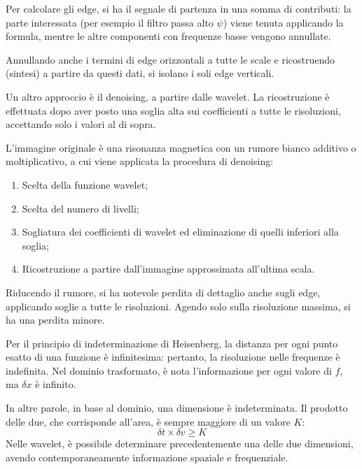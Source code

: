 Per calcolare gli edge, si ha il segnale di partenza in una somma di contributi: la parte interessata (per esempio il filtro passa alto $\psi$) viene tenuta applicando la formula, mentre le altre componenti con frequenze basse vengono annullate. 

Annullando anche i termini di edge orizzontali a tutte le scale e ricostruendo (sintesi) a partire da questi dati, si isolano i soli edge verticali.

Un altro approccio è il denoising, a partire dalle wavelet. La ricostruzione è effettuata dopo aver posto una soglia alta sui coefficienti a tutte le risoluzioni, accettando solo i valori al di sopra. 

L'immagine originale è una risonanza magnetica con un rumore bianco additivo o moltiplicativo, a cui viene applicata la procedura di denoising:
\begin{enumerate}
	\item Scelta della funzione wavelet;
	\item Scelta del numero di livelli;
	\item Sogliatura dei coefficienti di wavelet ed eliminazione di quelli inferiori alla soglia;
	\item Ricostruzione a partire dall'immagine approssimata all'ultima scala.
\end{enumerate}

Riducendo il rumore, si ha notevole perdita di dettaglio anche sugli edge, applicando soglie a tutte le risoluzioni. Agendo solo sulla risoluzione massima, si ha una perdita minore.

Per il principio di indeterminazione di Heisenberg, la distanza per ogni punto esatto di una funzione è infinitesima: pertanto, la risoluzione nelle frequenze è indefinita. Nel dominio trasformato, è nota l'informazione per ogni valore di $f$, ma $\delta x$ è infinito. 

In altre parole, in base al dominio, una dimensione è indeterminata. Il prodotto delle due, che corrisponde all'area, è sempre maggiore di un valore $K$:
$$\delta t \times \delta v \geq K$$
Nelle wavelet, è possibile determinare precedentemente una delle due dimensioni, avendo contemporaneamente informazione spaziale e frequenziale.

